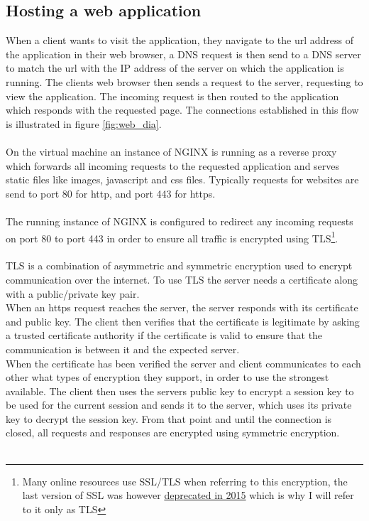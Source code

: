 \subsection{Hosting a web application}\label{sec:host}
When a client wants to visit the application, they navigate to the url address of the application in their web browser, a DNS request is then send to a DNS server to match the url with the IP address of the server on which the application is running. The clients web browser then sends a request to the server, requesting to view the application. The incoming request is then routed to the application which responds with the requested page. The connections established in this flow is illustrated in figure \ref{fig:web_dia}.\\\\
On the virtual machine an instance of NGINX is running as a reverse proxy which forwards all incoming requests to the requested application and serves static files like images, javascript and css files. Typically requests for websites are send to port 80 for http, and port 443 for https.\\\\The running instance of NGINX is configured to redirect any incoming requests on port 80 to port 443 in order to ensure all traffic is encrypted using TLS\footnote{Many online resources use SSL/TLS when referring to this encryption, the last version of SSL was however \href{https://datatracker.ietf.org/doc/html/rfc7568}{deprecated in 2015} which is why I will refer to it only as TLS}.\\\\
TLS is a combination of asymmetric and symmetric encryption used to encrypt communication over the internet. To use TLS the server needs a certificate along with a public/private key pair\cite{encrypt}.\\
When an https request reaches the server, the server responds with its certificate and public key. The client then verifies that the certificate is legitimate by asking a trusted certificate authority if the certificate is valid to ensure that the communication is between it and the expected server.\\
When the certificate has been verified the server and client communicates to each other what types of encryption they support, in order to use the strongest available. The client then uses the servers public key to encrypt a session key to be used for the current session and sends it to the server, which uses its private key to decrypt the session key. From that point and until the connection is closed, all requests and responses are encrypted using symmetric encryption.\\\\
